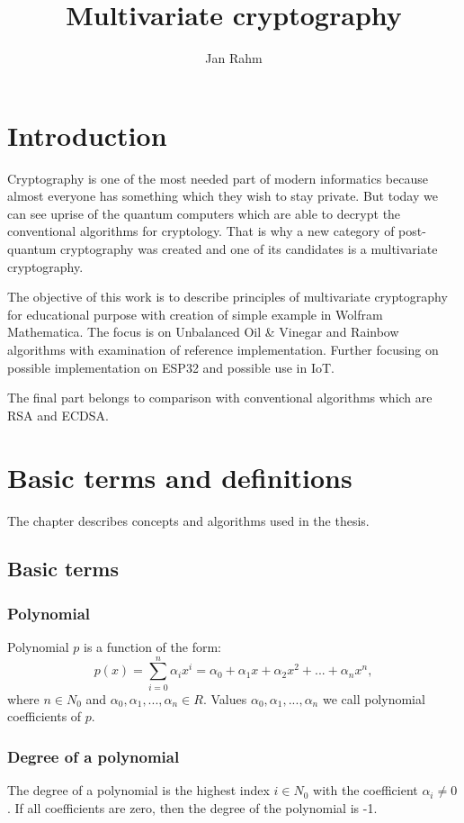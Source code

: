 \documentclass[thesis=M,english]{FITthesis}[2019/12/23]
\title{Multivariate cryptography}
\author{Jan Rahm} %
\begin{document}

\chapter{Introduction}
Cryptography is one of the most needed part of modern informatics because almost everyone has something which they wish to stay private. But today we can see uprise of the quantum computers which are able to decrypt the conventional algorithms for cryptology. That is why a new category of post-quantum cryptography was created and one of its candidates is a multivariate cryptography.

The objective of this work is to describe principles of multivariate cryptography for educational purpose with creation of simple example in Wolfram Mathematica. The focus is on Unbalanced Oil \& Vinegar and Rainbow algorithms with examination of reference implementation. Further focusing on possible implementation on ESP32 and possible use in IoT.

The final part belongs to comparison with conventional algorithms which are RSA and ECDSA.

\chapter{Basic terms and definitions}
The chapter describes concepts and algorithms used in the thesis.

\section{Basic terms}
\subsection{Polynomial}
Polynomial $p$ is a function of the form:
\[
	p(x) = \sum\limits_{i=0}^n {\alpha_ix^i} = \alpha_0 + \alpha_1x + \alpha_2x^2 + ... + \alpha_nx^n,
\]
where $n \in N_0$ and $\alpha_0, \alpha_1, ..., \alpha_n \in R$. Values $\alpha_0, \alpha_1, ..., \alpha_n$ we call polynomial coefficients of $p$.  

\subsection{Degree of a polynomial}
The degree of a polynomial is the highest index $i \in N_0$ with the coefficient $\alpha_i \ne 0$. If all coefficients are zero, then the degree of the polynomial is -1.
\end{document}
